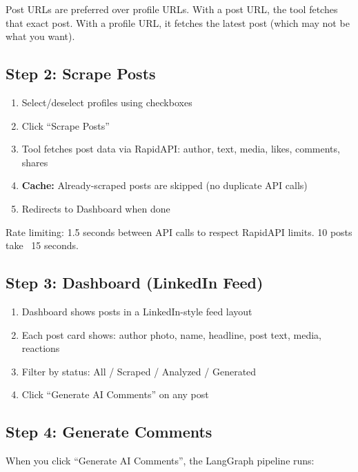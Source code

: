 \documentclass[12pt,a4paper]{article}
\begin{document}
\begin{tipbox}
Post URLs are preferred over profile URLs. With a post URL, the tool fetches that exact post. With a profile URL, it fetches the latest post (which may not be what you want).
\end{tipbox}

\subsection{Step 2: Scrape Posts}
\begin{enumerate}[leftmargin=1.5em]
    \item Select/deselect profiles using checkboxes
    \item Click ``Scrape Posts''
    \item Tool fetches post data via RapidAPI: author, text, media, likes, comments, shares
    \item \textbf{Cache:} Already-scraped posts are skipped (no duplicate API calls)
    \item Redirects to Dashboard when done
\end{enumerate}

\begin{infobox}
Rate limiting: 1.5 seconds between API calls to respect RapidAPI limits. 10 posts take ~15 seconds.
\end{infobox}

\subsection{Step 3: Dashboard (LinkedIn Feed)}
\begin{enumerate}[leftmargin=1.5em]
    \item Dashboard shows posts in a LinkedIn-style feed layout
    \item Each post card shows: author photo, name, headline, post text, media, reactions
    \item Filter by status: All / Scraped / Analyzed / Generated
    \item Click ``Generate AI Comments'' on any post
\end{enumerate}

\subsection{Step 4: Generate Comments}
When you click ``Generate AI Comments'', the LangGraph pipeline runs:
\end{document}
